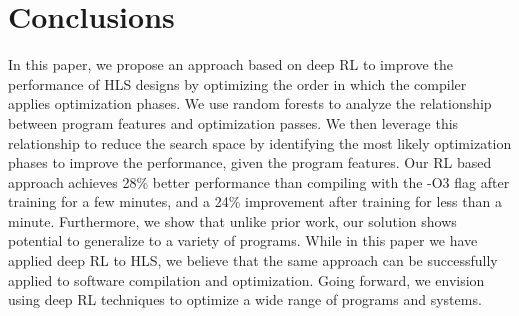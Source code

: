 \section{Conclusions} %
\label{sec:conc}
\vspace{-0.1cm}

In this paper, we propose an approach based on deep RL to improve the performance of HLS designs by optimizing the order in which the compiler applies optimization phases. We use random forests to analyze the relationship between program features and optimization passes. We then leverage this relationship to reduce the search space by identifying the most likely optimization phases to improve the performance, given the program features. Our RL based approach achieves 28\% better performance than compiling with the -O3 flag after training for a few minutes, and a 24\% improvement after training for less than a minute. Furthermore, we show that unlike prior work, our solution shows potential to generalize to a variety of programs.  
While in this paper we have applied deep RL to HLS, we believe that the same approach can be successfully applied to software compilation and optimization. Going forward, we envision using deep RL techniques to optimize a wide range of programs and systems.


